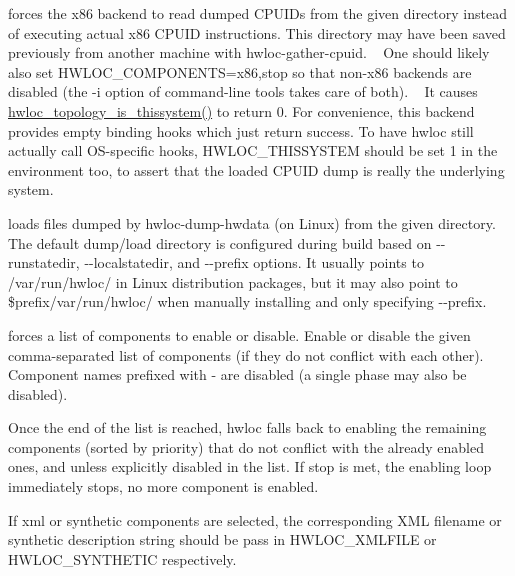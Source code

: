 \begin{DoxyDescription}
\item[H\+W\+L\+O\+C\+\_\+\+C\+P\+U\+I\+D\+\_\+\+P\+A\+TH=/path/to/cpuid/ ]forces the x86 backend to read dumped C\+P\+U\+I\+Ds from the given directory instead of executing actual x86 C\+P\+U\+ID instructions. This directory may have been saved previously from another machine with {\ttfamily hwloc-\/gather-\/cpuid}. ~\newline
 One should likely also set {\ttfamily H\+W\+L\+O\+C\+\_\+\+C\+O\+M\+P\+O\+N\+E\+N\+TS=x86,stop} so that non-\/x86 backends are disabled (the {\ttfamily -\/i} option of command-\/line tools takes care of both). ~\newline
 It causes \hyperlink{a00193_ga68ffdcfd9175cdf40709801092f18017}{hwloc\+\_\+topology\+\_\+is\+\_\+thissystem()} to return 0. For convenience, this backend provides empty binding hooks which just return success. To have hwloc still actually call O\+S-\/specific hooks, H\+W\+L\+O\+C\+\_\+\+T\+H\+I\+S\+S\+Y\+S\+T\+EM should be set 1 in the environment too, to assert that the loaded C\+P\+U\+ID dump is really the underlying system. 


\item[H\+W\+L\+O\+C\+\_\+\+D\+U\+M\+P\+E\+D\+\_\+\+H\+W\+D\+A\+T\+A\+\_\+\+D\+IR=/path/to/dumped/files/ ]loads files dumped by {\ttfamily hwloc-\/dump-\/hwdata} (on Linux) from the given directory. The default dump/load directory is configured during build based on -\/-\/runstatedir, -\/-\/localstatedir, and -\/-\/prefix options. It usually points to {\ttfamily /var/run/hwloc/} in Linux distribution packages, but it may also point to {\ttfamily \$prefix/var/run/hwloc/} when manually installing and only specifying -\/-\/prefix. 


\item[H\+W\+L\+O\+C\+\_\+\+C\+O\+M\+P\+O\+N\+E\+N\+TS=list,of,components ]forces a list of components to enable or disable. Enable or disable the given comma-\/separated list of components (if they do not conflict with each other). Component names prefixed with {\ttfamily -\/} are disabled (a single phase may also be disabled).

Once the end of the list is reached, hwloc falls back to enabling the remaining components (sorted by priority) that do not conflict with the already enabled ones, and unless explicitly disabled in the list. If {\ttfamily stop} is met, the enabling loop immediately stops, no more component is enabled.

If {\ttfamily xml} or {\ttfamily synthetic} components are selected, the corresponding X\+ML filename or synthetic description string should be pass in {\ttfamily H\+W\+L\+O\+C\+\_\+\+X\+M\+L\+F\+I\+LE} or {\ttfamily H\+W\+L\+O\+C\+\_\+\+S\+Y\+N\+T\+H\+E\+T\+IC} respectively.


\end{DoxyDescription}
